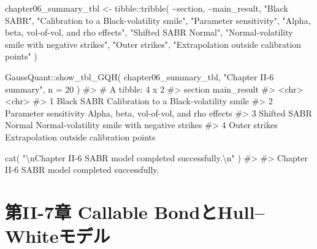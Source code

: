 \documentclass[
  letterpaper,
  DIV=11,
  numbers=noendperiod]{scrreprt}
\newenvironment{Shaded}{\begin{snugshade}}{\end{snugshade}}
\newcommand{\AttributeTok}[1]{\textcolor[rgb]{0.40,0.45,0.13}{#1}}
\newcommand{\CommentTok}[1]{\textcolor[rgb]{0.37,0.37,0.37}{#1}}
\newcommand{\DecValTok}[1]{\textcolor[rgb]{0.68,0.00,0.00}{#1}}
\newcommand{\FunctionTok}[1]{\textcolor[rgb]{0.28,0.35,0.67}{#1}}
\newcommand{\NormalTok}[1]{\textcolor[rgb]{0.00,0.23,0.31}{#1}}
\newcommand{\OtherTok}[1]{\textcolor[rgb]{0.00,0.23,0.31}{#1}}
\newcommand{\SpecialCharTok}[1]{\textcolor[rgb]{0.37,0.37,0.37}{#1}}
\newcommand{\StringTok}[1]{\textcolor[rgb]{0.13,0.47,0.30}{#1}}
\begin{document}
\begin{Shaded}
\begin{Highlighting}[]
\NormalTok{chapter06\_summary\_tbl }\OtherTok{\textless{}{-}}\NormalTok{ tibble}\SpecialCharTok{::}\FunctionTok{tribble}\NormalTok{(}
  \SpecialCharTok{\textasciitilde{}}\NormalTok{section,               }\SpecialCharTok{\textasciitilde{}}\NormalTok{main\_result,}
  \StringTok{"Black SABR"}\NormalTok{,            }\StringTok{"Calibration to a Black{-}volatility smile"}\NormalTok{,}
  \StringTok{"Parameter sensitivity"}\NormalTok{, }\StringTok{"Alpha, beta, vol{-}of{-}vol, and rho effects"}\NormalTok{,}
  \StringTok{"Shifted SABR Normal"}\NormalTok{,   }\StringTok{"Normal{-}volatility smile with negative strikes"}\NormalTok{,}
  \StringTok{"Outer strikes"}\NormalTok{,         }\StringTok{"Extrapolation outside calibration points"}
\NormalTok{)}

\NormalTok{GaussQuant}\SpecialCharTok{::}\FunctionTok{show\_tbl\_GQH}\NormalTok{(}
\NormalTok{  chapter06\_summary\_tbl,}
  \StringTok{"Chapter II{-}6 summary"}\NormalTok{,}
  \AttributeTok{n =} \DecValTok{20}
\NormalTok{)}
\CommentTok{\#\textgreater{} \# A tibble: 4 x 2}
\CommentTok{\#\textgreater{}   section               main\_result                                  }
\CommentTok{\#\textgreater{}   \textless{}chr\textgreater{}                 \textless{}chr\textgreater{}                                        }
\CommentTok{\#\textgreater{} 1 Black SABR            Calibration to a Black{-}volatility smile      }
\CommentTok{\#\textgreater{} 2 Parameter sensitivity Alpha, beta, vol{-}of{-}vol, and rho effects     }
\CommentTok{\#\textgreater{} 3 Shifted SABR Normal   Normal{-}volatility smile with negative strikes}
\CommentTok{\#\textgreater{} 4 Outer strikes         Extrapolation outside calibration points}

\FunctionTok{cat}\NormalTok{(}
  \StringTok{"}\SpecialCharTok{\textbackslash{}n}\StringTok{Chapter II{-}6 SABR model completed successfully.}\SpecialCharTok{\textbackslash{}n}\StringTok{"}
\NormalTok{)}
\CommentTok{\#\textgreater{} }
\CommentTok{\#\textgreater{} Chapter II{-}6 SABR model completed successfully.}
\end{Highlighting}
\end{Shaded}

\chapter{第II-7章 Callable
BondとHull--Whiteモデル}\label{ux7b2cii-7ux7ae0-callable-bondux3068hullwhiteux30e2ux30c7ux30eb}
\end{document}
